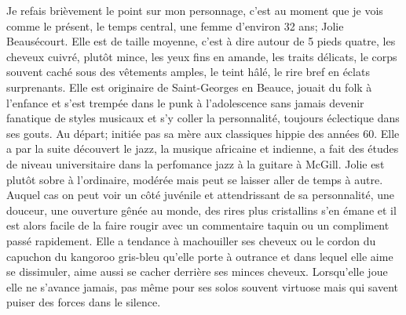 Je refais brièvement le point sur mon personnage, c'est au moment que je
vois comme le présent, le temps central, une femme d'environ 32 ans; Jolie
Beausécourt. Elle est de taille moyenne, c'est à dire autour de 5 pieds quatre, les
cheveux cuivré, plutôt mince, les yeux fins en amande, les traits délicats, le
corps souvent caché sous des vêtements amples, le teint hâlé, le rire bref en
éclats surprenants. Elle est originaire de Saint-Georges en Beauce, jouait du
folk à l'enfance et s'est trempée dans le punk à l'adolescence sans jamais devenir 
fanatique de styles musicaux et s'y coller la personnalité, toujours éclectique
dans ses gouts. Au départ; initiée pas sa mère aux classiques hippie des années 60.  Elle
a par la suite découvert le jazz, la musique africaine et indienne, a fait des
études de niveau universitaire dans la perfomance jazz à la guitare à McGill.
Jolie est plutôt sobre à l'ordinaire, modérée mais peut se laisser aller de
temps à autre. Auquel cas on peut voir un côté juvénile et attendrissant de sa
personnalité, une douceur, une ouverture gênée au monde, des rires plus
cristallins s'en émane et il est alors facile de la faire rougir avec un
commentaire taquin ou un compliment passé rapidement. Elle a tendance à
machouiller ses cheveux ou le cordon du capuchon du kangoroo gris-bleu qu'elle
porte à outrance et dans lequel elle aime se dissimuler, aime aussi se cacher derrière ses
minces cheveux. Lorsqu'elle joue elle ne s'avance jamais, pas même pour ses
solos souvent virtuose mais qui savent puiser des forces dans le silence. \\ 


